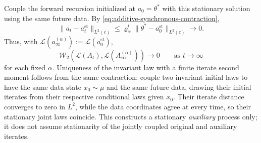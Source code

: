 \documentclass[11pt,letterpaper]{article}
\theoremstyle{plain}
\theoremstyle{definition}
\theoremstyle{remark}
\newcommand{\W}{\mathcal{W}}
\newcommand{\law}{\mathcal{L}}
\begin{document}
Couple the forward recursion initialized at $a_0=\theta^*$ with this
stationary solution using the same future data. By
\eqref{eq:additive-synchronous-contraction},
\[
    \|a_t-a_t^{\mathrm{st}}\|_{L^2(c)}
    \leq\varrho_\alpha^t
          \|\theta^*-a_0^{\mathrm{st}}\|_{L^2(c)}
    \longrightarrow0.
\]
Thus, with $\law(a_\infty^{(\alpha)}):=\law(a_0^{\mathrm{st}})$,
\[
    \W_2\!\left(\law(A_t),\law(A_\infty^{(\alpha)})\right)
    \longrightarrow0
    \qquad\text{as }t\to\infty
\]
for each fixed $\alpha$. Uniqueness of the invariant law with a finite
iterate second moment follows from the same contraction: couple two
invariant initial laws to have the same data state $x_0\sim\mu$ and the
same future data, drawing their initial iterates from their respective
conditional laws given $x_0$. Their iterate distance converges to zero
in $L^2$, while the data coordinates agree at every time, so their
stationary joint laws coincide. This constructs a stationary
\emph{auxiliary} process only; it does not assume stationarity of the
jointly coupled original and auxiliary iterates.
\end{document}
